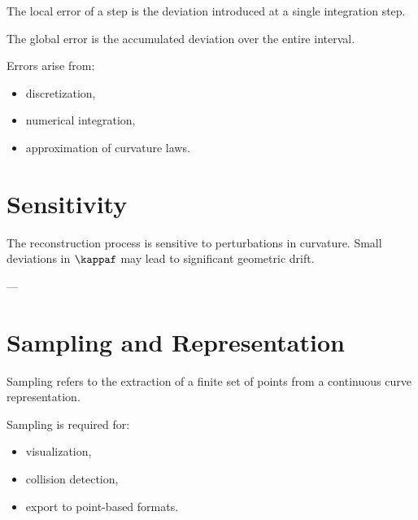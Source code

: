 \begin{definition}
The local error of a step is the deviation introduced at a single
integration step.
\end{definition}

\begin{definition}
The global error is the accumulated deviation over the entire interval.
\end{definition}

\begin{remark}
Errors arise from:
\begin{itemize}
\item discretization,
\item numerical integration,
\item approximation of curvature laws.
\end{itemize}
\end{remark}


\section{Sensitivity}

\begin{remark}
The reconstruction process is sensitive to perturbations in curvature.
Small deviations in $\kappaf$ may lead to significant geometric drift.
\end{remark}



---

\section{Sampling and Representation}

\begin{definition}[Sampling]
Sampling refers to the extraction of a finite set of points from a
continuous curve representation.
\end{definition}

\begin{remark}
Sampling is required for:
\begin{itemize}
\item visualization,
\item collision detection,
\item export to point-based formats.
\end{itemize}
\end{remark}

